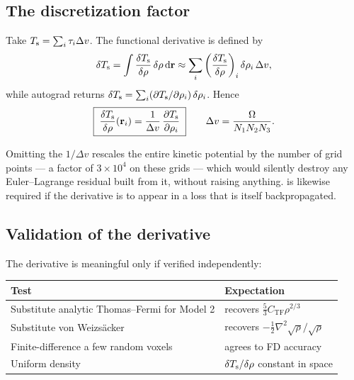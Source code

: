 \subsection{The discretization factor}

Take $T_{\mathrm{s}} = \sum_i \tau_i \Delta v$. The functional derivative is defined by
\[
  \delta T_{\mathrm{s}} = \int \frac{\delta T_{\mathrm{s}}}{\delta\rho}\,\delta\rho\,\mathrm{d}\mathbf{r}
  \approx \sum_i \left(\frac{\delta T_{\mathrm{s}}}{\delta\rho}\right)_i
          \delta\rho_i\,\Delta v ,
\]
while autograd returns
$\delta T_{\mathrm{s}} = \sum_i (\partial T_{\mathrm{s}}/\partial\rho_i)\,\delta\rho_i$. Hence
\begin{equation}
  \boxed{\;
    \frac{\delta T_{\mathrm{s}}}{\delta\rho}(\mathbf{r}_i)
      = \frac{1}{\Delta v}\,\frac{\partial T_{\mathrm{s}}}{\partial \rho_i} \;}
  \qquad \Delta v = \frac{\Omega}{N_1N_2N_3} .
\end{equation}

\begin{pwarn}
Omitting the $1/\Delta v$ rescales the entire kinetic potential by the number of
grid points --- a factor of $3\times10^{4}$ on these grids --- which would
silently destroy any Euler--Lagrange residual built from it, without raising
anything.  is likewise required if the derivative is to
appear in a loss that is itself backpropagated.
\end{pwarn}

\subsection{Validation of the derivative}

The derivative is meaningful only if verified independently:

\begin{center}
\begin{tabular}{@{}ll@{}}
\toprule
Test & Expectation \\
\midrule
Substitute analytic Thomas--Fermi for Model 2
  & recovers $\tfrac{5}{3}C_{\mathrm{TF}}\rho^{2/3}$ \\
Substitute von Weizsäcker
  & recovers $-\tfrac12\nabla^2\sqrt\rho/\sqrt\rho$ \\
Finite-difference a few random voxels & agrees to FD accuracy \\
Uniform density & $\delta T_{\mathrm{s}}/\delta\rho$ constant in space \\
\bottomrule
\end{tabular}
\end{center}

